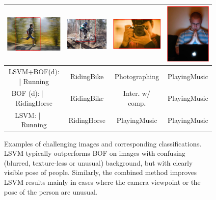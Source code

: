 \documentclass[extendedabs]{bmvc2k}
\newcommand{\ok}[1]{{\small \scriptsize  \color{mygreen} #1}} %
\newcommand{\bad}[1]{{\small \scriptsize  \color{red} #1}} %
\newcommand{\cfs}{\small}   %
\begin{document}
\begin{figure}[ht]
\centering
\begin{tabular}{|c|c|c|c|}
\hline
\includegraphics[height=.14\linewidth]{figs/misC2_RidingHorse_instead_Running_img0037.png}
&
\includegraphics[height=.14\linewidth]{figs/misLSVM_RidingHorse_instead_RidingBike_img0192.png}
&
\includegraphics[height=.14\linewidth]{figs/misLSVM_PlayingMusic_instead_Photographing_img0009.png}
&
\includegraphics[height=.14\linewidth]{figs/misLSVMC2_PlayingMusic_instead_InteractingWithComputer_img0036.png}\\
\hline
 \scriptsize LSVM+BOF(d): | \ok{Running}         & \ok{RidingBike}   & \ok{Photographing}    & \bad{PlayingMusic} \\ \hline
 \scriptsize BOF (d):     | ~~~\bad{RidingHorse} & \ok{RidingBike}   & \bad{Inter. w/ comp.} & \bad{PlayingMusic} \\ \hline
 \scriptsize LSVM:        | ~~~\ok{Running}      & \bad{RidingHorse} & \bad{PlayingMusic}    & \bad{PlayingMusic} \\ \hline
\end{tabular}
\vspace{1mm}
\caption{\cfs Examples of challenging images and corresponding classifications. LSVM typically outperforms BOF on images with confusing (blurred, texture-less or
unusual) background, but with clearly visible pose of people. Similarly, the combined method improves LSVM
results mainly in cases where the camera viewpoint or the pose of the person are unusual.
\normalsize}
\label{fig:hard_sample}
\vspace{-2mm}
\end{figure}
\end{document}
